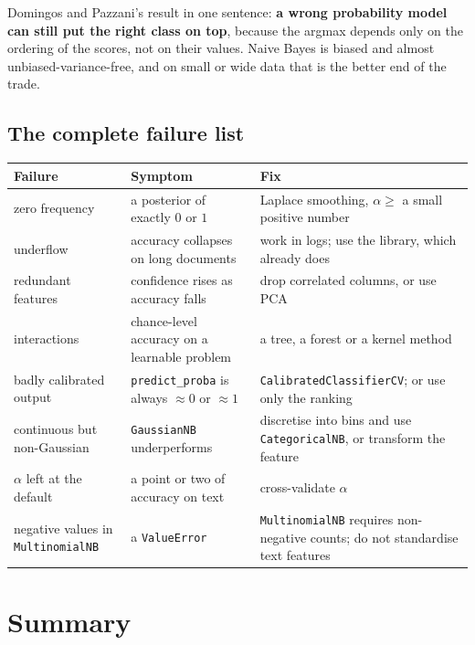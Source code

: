 \documentclass[11pt]{article}
\begin{document}
\begin{keyidea}
Domingos and Pazzani's result in one sentence: \textbf{a wrong probability
model can still put the right class on top}, because the argmax depends only
on the ordering of the scores, not on their values. Naive Bayes is biased and
almost unbiased-variance-free, and on small or wide data that is the better
end of the trade.
\end{keyidea}

\subsection{The complete failure list}

\begin{center}\small
\begin{tabular}{@{}p{3.5cm}p{4.3cm}p{6.2cm}@{}}
\toprule
\textbf{Failure} & \textbf{Symptom} & \textbf{Fix}\\
\midrule
zero frequency & a posterior of exactly $0$ or $1$ &
  Laplace smoothing, $\alpha \ge$ a small positive number\\
underflow & accuracy collapses on long documents &
  work in logs; use the library, which already does\\
redundant features & confidence rises as accuracy falls &
  drop correlated columns, or use PCA\\
interactions & chance-level accuracy on a learnable problem &
  a tree, a forest or a kernel method\\
badly calibrated output & \texttt{predict\_proba} is always
  $\approx 0$ or $\approx 1$ &
  \texttt{CalibratedClassifierCV}; or use only the ranking\\
continuous but non-Gaussian & \texttt{GaussianNB} underperforms &
  discretise into bins and use \texttt{CategoricalNB}, or transform the
  feature\\
$\alpha$ left at the default & a point or two of accuracy on text &
  cross-validate $\alpha$\\
negative values in \texttt{MultinomialNB} & a \texttt{ValueError} &
  \texttt{MultinomialNB} requires non-negative counts; do not standardise
  text features\\
\bottomrule
\end{tabular}
\end{center}

\section{Summary}
\label{sec:summary}
\end{document}
